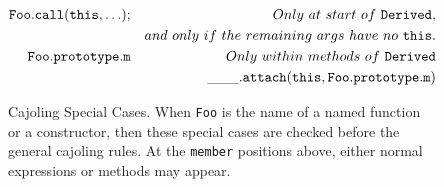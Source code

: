 \documentclass[letterpaper,twocolumn,10pt]{article}
\newcommand{\code}[1]{{\tt {#1}}}              %
\begin{document}
\begin{figure}
\begin{eqnarray}
  \code{Foo.call(this,\ldots);} 
                   & \label{call:implicit-super-init} & Only\ at\ start\ of\ \code{Derived}, \\
                   & \nonumber                        & and\ only\ if\ the\ remaining\ args\ have\ no\ \code{this}.\\
  \code{Foo.prototype.m} 
                   & \label{read:attach-super-method} & Only\ within\ methods\ of\ \code{Derived} \\
                   & \nonumber                        & \code{\_\_\_.attach(this,Foo.prototype.m)}
\end{eqnarray}

\caption[Cajoling Special Cases]{Cajoling Special Cases. When \code{Foo} is 
the name of a named function or a constructor, then these special cases are 
checked before the general cajoling rules. At the \code{member} positions 
above, either normal expressions or methods may appear.}
\label{tab:special-cases}
\end{figure}
\end{document}
